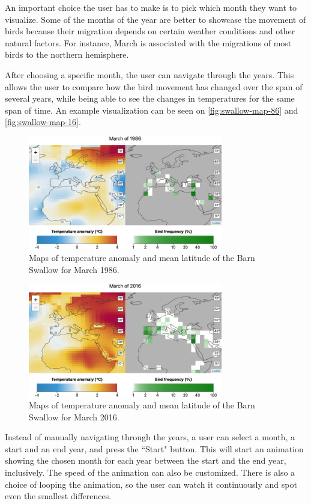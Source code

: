 \documentclass[journal]{vgtc}                %
\begin{document}
An important choice the user has to make is to pick which month they want to visualize. Some of the months of the year are better to showcase the movement of birds because their migration depends on certain weather conditions and other natural factors. For instance, March is associated with the migrations of most birds to the northern hemisphere.

After choosing a specific month, the user can navigate through the years. This allows the user to compare how the bird movement has changed over the span of several years, while being able to see the changes in temperatures for the same span of time. An example visualization can be seen on \autoref{fig:swallow-map-86} and \autoref{fig:swallow-map-16}.

\begin{figure}[h]
  \centering
  \includegraphics[width=85mm]{march86-map-barnswallow}
  \caption{Maps of temperature anomaly and mean latitude of the Barn Swallow for March 1986.}
  \label{fig:swallow-map-86}
\end{figure}

\begin{figure}[h]
  \centering
  \includegraphics[width=85mm]{march16-map-barnswallow}
  \caption{Maps of temperature anomaly and mean latitude of the Barn Swallow for March 2016.}
  \label{fig:swallow-map-16}
\end{figure}

Instead of manually navigating through the years, a user can select a month, a start and an end year, and press the ``Start" button. This will start an animation showing the chosen month for each year between the start and the end year, inclusively. The speed of the animation can also be customized. There is also a choice of looping the animation, so the user can watch it continuously and spot even the smallest differences.
\end{document}
